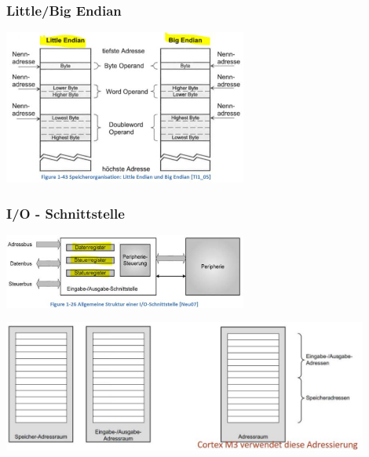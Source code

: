 \begin{multicols}{2}
    \subsubsection{Little/Big Endian}
    \includegraphics[width=8cm]{images/LittleBigEndian}
    
    \subsubsection{I/O - Schnittstelle}
    \includegraphics[width=8cm]{images/IOSchnittstelle}
\end{multicols}

\includegraphics[width=12cm]{images/Speicherraumadressierung}
\clearpage






















